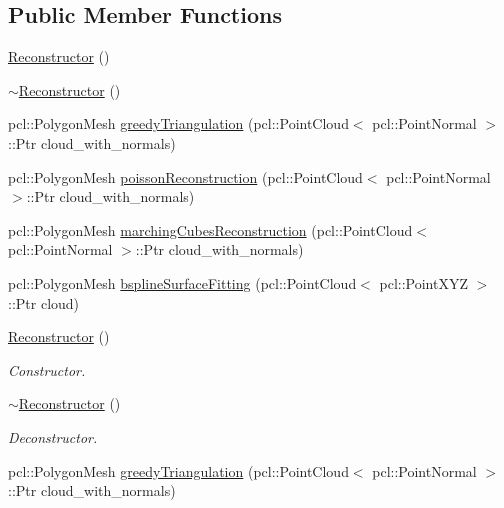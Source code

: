 \subsection*{Public Member Functions}
\begin{DoxyCompactItemize}
\item 
\hyperlink{classhull__abstraction_1_1_reconstructor_a621404f6ce3a4515adf85491543ace34}{Reconstructor} ()
\item 
\hyperlink{classhull__abstraction_1_1_reconstructor_a0db70f08234b090c7a5c58872dbd16c4}{$\sim$\+Reconstructor} ()
\item 
pcl\+::\+Polygon\+Mesh \hyperlink{classhull__abstraction_1_1_reconstructor_a585b9418c1a64ec21c195c72139ce581}{greedy\+Triangulation} (pcl\+::\+Point\+Cloud$<$ pcl\+::\+Point\+Normal $>$\+::Ptr cloud\+\_\+with\+\_\+normals)
\item 
pcl\+::\+Polygon\+Mesh \hyperlink{classhull__abstraction_1_1_reconstructor_a9b7e8bda9c001e4d2eab2712e2b57f04}{poisson\+Reconstruction} (pcl\+::\+Point\+Cloud$<$ pcl\+::\+Point\+Normal $>$\+::Ptr cloud\+\_\+with\+\_\+normals)
\item 
pcl\+::\+Polygon\+Mesh \hyperlink{classhull__abstraction_1_1_reconstructor_a98e633c1c4e98926b0e1beda2e867524}{marching\+Cubes\+Reconstruction} (pcl\+::\+Point\+Cloud$<$ pcl\+::\+Point\+Normal $>$\+::Ptr cloud\+\_\+with\+\_\+normals)
\item 
pcl\+::\+Polygon\+Mesh \hyperlink{classhull__abstraction_1_1_reconstructor_a531c5dc53b28b4f1e48a318db1acea90}{bspline\+Surface\+Fitting} (pcl\+::\+Point\+Cloud$<$ pcl\+::\+Point\+X\+YZ $>$\+::Ptr cloud)
\item 
\hyperlink{classhull__abstraction_1_1_reconstructor_a621404f6ce3a4515adf85491543ace34}{Reconstructor} ()
\begin{DoxyCompactList}\small\item\em Constructor. \end{DoxyCompactList}\item 
\hyperlink{classhull__abstraction_1_1_reconstructor_a0db70f08234b090c7a5c58872dbd16c4}{$\sim$\+Reconstructor} ()
\begin{DoxyCompactList}\small\item\em Deconstructor. \end{DoxyCompactList}\item 
pcl\+::\+Polygon\+Mesh \hyperlink{classhull__abstraction_1_1_reconstructor_a585b9418c1a64ec21c195c72139ce581}{greedy\+Triangulation} (pcl\+::\+Point\+Cloud$<$ pcl\+::\+Point\+Normal $>$\+::Ptr cloud\+\_\+with\+\_\+normals)

\end{DoxyCompactItemize}
